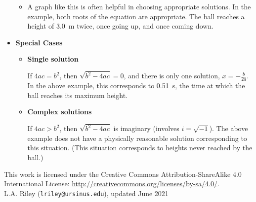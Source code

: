 \documentclass[12pt]{article}
\begin{document}
\begin{itemize}
\begin{itemize}
  \item A graph like this is often helpful in choosing appropriate
    solutions. In the example, both roots of the equation are
    appropriate. The ball reaches a height of 3.0~m twice, once going
    up, and once coming down.

  \end{itemize}

\item \textbf{Special Cases}

  \begin{itemize}
  \item \textbf{Single solution}

    If $4ac = b^2$, then $\sqrt{b^2-4ac} = 0$, and there is only one
    solution, $x=-\frac{b}{2a}$. In the above example, this corresponds to
    0.51~s, the time at which the ball reaches its maximum height. 

  \item \textbf{Complex solutions}

    If $4ac > b^2$, then $\sqrt{b^2-4ac}$ is imaginary (involves $i =
    \sqrt{-1}$). The above example does not have a physically reasonable
    solution corresponding to this situation. (This situation corresponds
    to heights never reached by the ball.)

  \end{itemize}

\end{itemize}

{\footnotesize
  \noindent
  \hrulefill
  
  \noindent
  This work is licensed under the Creative Commons
  Attribution-ShareAlike 4.0 International License: 
  \url{http://creativecommons.org/licenses/by-sa/4.0/}.\\

  \noindent
  L.A. Riley (\texttt{lriley@ursinus.edu}), updated June 2021
}
\end{document}
